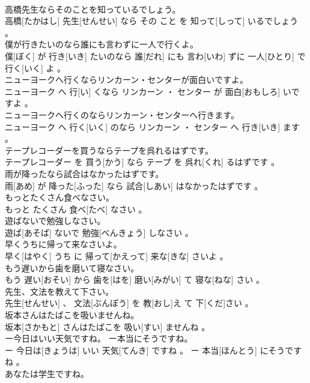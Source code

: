 \documentclass[8pt]{extreport}
\begin{document}
\begin{CJK}{UTF8}{min}
\\	高橋先生ならそのことを知っているでしょう。	
\\	高橋[たかはし] 先生[せんせい] なら その こと を 知って[しって] いるでしょう 。
\\	僕が行きたいのなら誰にも言わずに一人で行くよ。	
\\	僕[ぼく] が 行き[いき] たいのなら 誰[だれ] にも 言わ[いわ] ずに 一人[ひとり] で 行く[いく] よ 。
\\	ニューヨークへ行くならリンカーン・センターが面白いですよ。	
\\	ニューヨーク へ 行[い] くなら リンカーン ・ センター が 面白[おもしろ] いですよ 。
\\	ニューヨークへ行くのならリンカーン・センターへ行きます。	
\\	ニューヨーク へ 行く[いく] のなら リンカーン ・ センター へ 行き[いき] ます 。
\\	テープレコーダーを買うならテープを呉れるはずです。	
\\	テープレコーダー を 買う[かう] なら テープ を 呉れ[くれ] るはずです 。
\\	雨が降ったなら試合はなかったはずです。	
\\	雨[あめ] が 降った[ふった] なら 試合[しあい] はなかったはずです 。
\\	もっとたくさん食べなさい。	
\\	もっと たくさん 食べ[たべ] なさい 。
\\	遊ばないで勉強しなさい。	
\\	遊ば[あそば] ないで 勉強[べんきょう] しなさい 。
\\	早くうちに帰って来なさいよ。	
\\	早く[はやく] うち に 帰って[かえって] 来な[きな] さいよ 。
\\	もう遅いから歯を磨いて寝なさい。	
\\	もう 遅い[おそい] から 歯を[はを] 磨い[みがい] て 寝な[ねな] さい 。
\\	先生、文法を教えて下さい。	
\\	先生[せんせい] 、 文法[ぶんぽう] を 教[おし]え て 下[くだ]さい 。
\\	坂本さんはたばこを吸いませんね。	
\\	坂本[さかもと] さんはたばこを 吸い[すい] ませんね 。
\\	ー今日はいい天気ですね。 ー本当にそうですね。	
\\	ー 今日は[きょうは] いい 天気[てんき] ですね 。 ー 本当[ほんとう] にそうですね 。
\\	あなたは学生ですね。	

\end{CJK}
\end{document}
